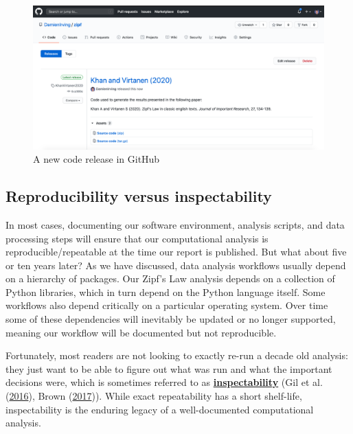 \documentclass[
]{krantz}
\newcommand{\gref}[2]{\hyperlink{#2}{\textbf{#1}}}
\begin{document}
\begin{figure}

{\centering \includegraphics[width=1\linewidth]{figures/provenance/release} 

}

\caption{A new code release in GitHub}\label{fig:provenance-release}
\end{figure}

\hypertarget{provenance-inspectability}{%
\subsection{Reproducibility versus inspectability}\label{provenance-inspectability}}

In most cases,
documenting our software environment, analysis scripts, and data processing steps
will ensure that our computational analysis is reproducible/repeatable
at the time our report is published.
But what about five or ten years later?
As we have discussed,
data analysis workflows usually depend on a hierarchy of packages.
Our Zipf's Law analysis depends on a collection of Python libraries,
which in turn depend on the Python language itself.
Some workflows also depend critically on a particular operating system.
Over time some of these dependencies will inevitably be updated or no longer supported,
meaning our workflow will be documented but not reproducible.

Fortunately,
most readers are not looking to exactly re-run a decade old analysis:
they just want to be able to figure out what was run
and what the important decisions were,
which is sometimes referred to as \gref{inspectability}{inspectability}
(Gil et al. (\protect\hyperlink{ref-Gil2016}{2016}), Brown (\protect\hyperlink{ref-Brown2017}{2017})).
While exact repeatability has a short shelf-life,
inspectability is the enduring legacy of a well-documented computational analysis.
\end{document}
